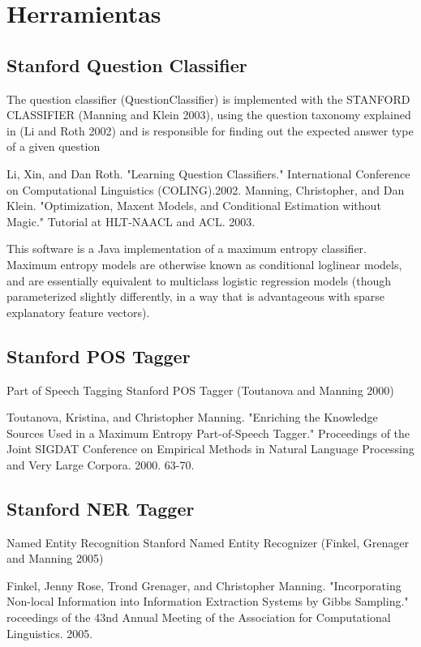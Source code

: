 \appendix
\chapter{Herramientas}

\section{Stanford Question Classifier}
The question classifier (QuestionClassifier) is implemented with the 
STANFORD CLASSIFIER (Manning and Klein 2003), using the question taxonomy 
explained in (Li and Roth 2002) and is responsible for finding out the expected 
answer type of a given question

Li, Xin, and Dan Roth. "Learning Question Classifiers." International Conference 
on Computational Linguistics (COLING).2002.
Manning, Christopher, and Dan Klein. "Optimization, Maxent Models, and 
Conditional Estimation without Magic." Tutorial at HLT-NAACL and ACL. 2003.

This software is a Java implementation of a maximum entropy classifier.
Maximum entropy models are otherwise known as conditional loglinear
models, and are essentially equivalent to multiclass logistic
regression models (though parameterized slightly differently, in a way
that is advantageous with sparse explanatory feature vectors). 

\section{Stanford POS Tagger}

Part of Speech Tagging Stanford POS Tagger (Toutanova and Manning 
2000)

Toutanova, Kristina, and Christopher Manning. "Enriching the Knowledge 
Sources Used in a Maximum Entropy Part-of-Speech Tagger." Proceedings of 
the Joint SIGDAT Conference on Empirical Methods in Natural Language 
Processing and Very Large Corpora. 2000. 63-70.


\section{Stanford NER Tagger}

Named Entity Recognition Stanford Named Entity Recognizer (Finkel, 
Grenager and Manning 2005)

Finkel, Jenny Rose, Trond Grenager, and Christopher Manning. "Incorporating 
Non-local Information into Information Extraction Systems by Gibbs Sampling." 
roceedings of the 43nd Annual Meeting of the Association for Computational 
Linguistics. 2005.


